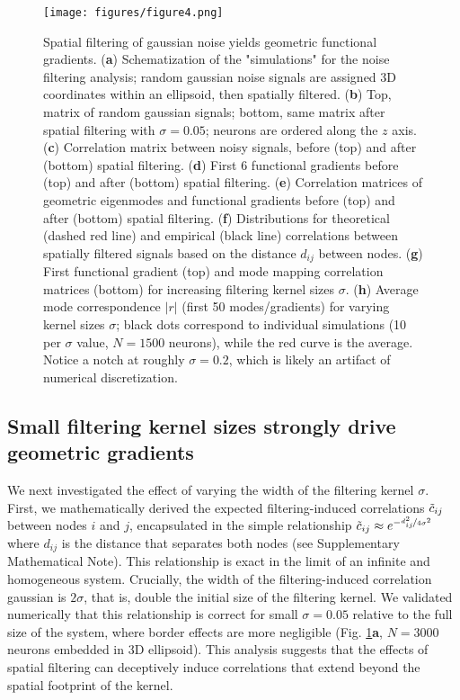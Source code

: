 \documentclass{article}
\begin{document}
\begin{figure}[t]
    \centering
    \texttt{[image: figures/figure4.png]}
    \caption{Spatial filtering of gaussian noise yields geometric functional gradients. (\textbf{a}) Schematization of the "simulations" for the noise filtering analysis; random gaussian noise signals are assigned 3D coordinates within an ellipsoid, then spatially filtered. (\textbf{b}) Top, matrix of random gaussian signals; bottom, same matrix after spatial filtering with $\sigma=0.05$; neurons are ordered along the $z$ axis. (\textbf{c}) Correlation matrix between noisy signals, before (top) and after (bottom) spatial filtering. (\textbf{d}) First 6 functional gradients before (top) and after (bottom) spatial filtering. (\textbf{e}) Correlation matrices of geometric eigenmodes and functional gradients before (top) and after (bottom) spatial filtering. (\textbf{f}) Distributions for theoretical (dashed red line) and empirical (black line) correlations between spatially filtered signals based on the distance $d_{ij}$ between nodes. (\textbf{g}) First functional gradient (top) and mode mapping correlation matrices (bottom) for increasing filtering kernel sizes $\sigma$. (\textbf{h}) Average mode correspondence $|r|$ (first 50 modes/gradients) for varying kernel sizes $\sigma$; black dots correspond to individual simulations (10 per $\sigma$ value, $N=1500$ neurons), while the red curve is the average. Notice a notch at roughly $\sigma=0.2$, which is likely an artifact of numerical discretization.}
    \label{fig4}
    \hrulefill
\end{figure}

\subsection*{Small filtering kernel sizes strongly drive geometric gradients}

 We next investigated the effect of varying the width of the filtering kernel $\sigma$. First, we mathematically derived the expected filtering-induced correlations $\Tilde{c}_{ij}$ between nodes $i$ and $j$, encapsulated in the simple relationship $\Tilde{c}_{ij}\approx e^{-\nicefrac{d_{ij}^2}{4\sigma^2}}$  where $d_{ij}$ is the distance that separates both nodes (see Supplementary Mathematical Note). This relationship is exact in the limit of an infinite and homogeneous system. Crucially, the width of the filtering-induced correlation gaussian is $2\sigma$, that is, double the initial size of the filtering kernel. We validated numerically that this relationship is correct for small $\sigma=0.05$ relative to the full size of the system, where border effects are more negligible (Fig. \ref{fig4}\textbf{a}, $N=3000$ neurons embedded in 3D ellipsoid). This analysis suggests that the effects of spatial filtering can deceptively induce correlations that extend beyond the spatial footprint of the kernel.
\end{document}
